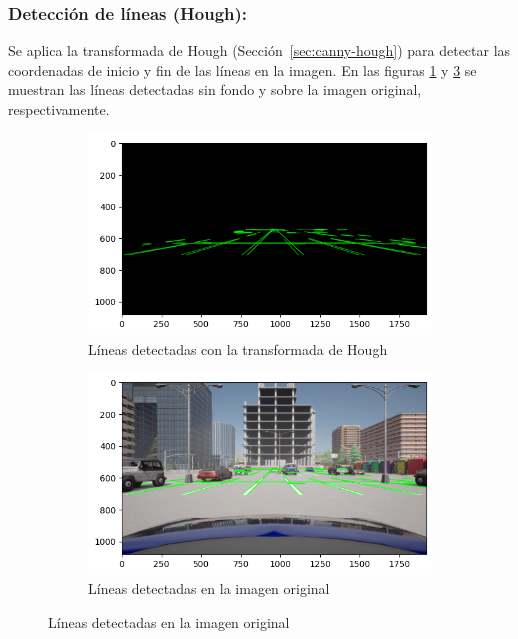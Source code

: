 \subsubsection{Detección de líneas (Hough):}
\noindent
Se aplica la transformada de Hough \cite{ballard1981hough} (Sección~\ref{sec:canny-hough}) para detectar las coordenadas de inicio y fin de las líneas en la imagen.
En las figuras \ref{fig:hough} y \ref{fig:lines} se muestran las líneas detectadas sin fondo y sobre la imagen original, respectivamente.
\begin{figure}[!ht]
    \begin{subfigure}{0.5\textwidth}
        \includegraphics[width=\textwidth]{img/reticule/hough2}
        \caption{Líneas detectadas con la transformada de Hough}
        \label{fig:hough}
    \end{subfigure}
    \begin{subfigure}{0.5\textwidth}
        \includegraphics[width=\textwidth]{img/reticule/hough}
        \caption{Líneas detectadas en la imagen original}
        \label{fig:lines}
    \end{subfigure}
\end{figure}

